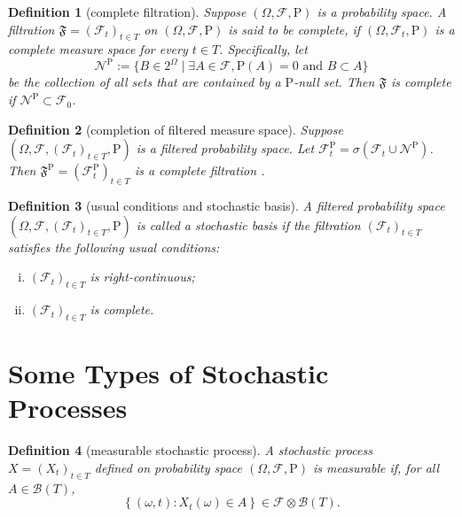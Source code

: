 \documentclass{report}
\newtheorem{definition}{Definition}[section]
\theoremstyle{nonumberplain}
\begin{document}
\begin{definition}[complete filtration]
	Suppose $(\Omega,\mathcal{F},\mathrm{P})$ is a probability space. A filtration $\mathfrak{F} =(\mathcal{F}_{t})_{t\in T}$ on $(\Omega,\mathcal{F},\mathrm{P})$ is said to be \emph{complete}, if $(\Omega,\mathcal{F}_{t},\mathrm{P})$ is a complete measure space for every $t\in T$. 
	Specifically, let
	\[
		\mathcal{N}^{\mathrm{P}}:=\{B\in 2^\Omega \mid \exists A\in\mathcal{F},\mathrm{P}(A)=0\text{ and }B\subset A\}
	\]
	be the collection of all sets that are contained by a $\mathrm{P}$-null set. Then $\mathfrak{F}$ is complete if $\mathcal{N}^{\mathrm{P}}\subset \mathcal{F}_{0}$. 
\end{definition}

\begin{definition}[completion of filtered measure space]
	Suppose $(\Omega,\mathcal{F},(\mathcal{F}_{t})_{t\in T }, \mathrm{P})$ is a filtered probability space. Let $\mathcal{F}_{t}^{\mathrm{P}}=\sigma\left(\mathcal{F}_{t} \cup \mathcal{N}^{\mathrm{P}}\right)$. Then $\mathfrak{F}^{\mathrm{P}} =(\mathcal{F}_{t}^{\mathrm{P}})_{t\in T}$ is a complete filtration .
\end{definition}

\begin{definition}[usual conditions and stochastic basis]
	A filtered probability space $(\Omega,\mathcal{F},(\mathcal{F}_{t})_{t\in T },\mathrm{P})$ is called a \emph{stochastic basis} if the filtration $(\mathcal{F}_{t})_{t\in T }$ satisfies the following \emph{usual conditions}:
	\begin{enumerate}[(i)]
		\item $(\mathcal{F}_{t})_{t\in T }$ is right-continuous;
		\item $(\mathcal{F}_{t})_{t\in T }$ is complete.
	\end{enumerate}
\end{definition}

\section{Some Types of Stochastic Processes}

\begin{definition}[measurable stochastic process]
	A stochastic process $X=(X_t)_{t\in T}$ defined on probability space $(\Omega,\mathcal{F},\mathrm{P})$ is \emph{measurable} if, for all $A \in \mathcal{B}\left(T\right)$,
	\[
	\left\{( \omega,t): X_{t}(\omega) \in A\right\} \in \mathcal{F}\otimes \mathcal{B}(T) .
	\]
\end{definition}
\end{document}
